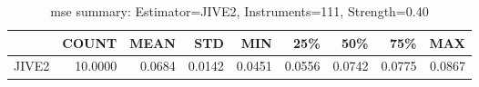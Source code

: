 \begin{table}[ht]
\centering
\caption{mse summary: Estimator=JIVE2, Instruments=111, Strength=0.40}
\begin{tabular}{lrrrrrrrr}
\toprule
 & COUNT & MEAN & STD & MIN & 25\% & 50\% & 75\% & MAX \\
\midrule
JIVE2 & 10.0000 & 0.0684 & 0.0142 & 0.0451 & 0.0556 & 0.0742 & 0.0775 & 0.0867 \\
\bottomrule
\end{tabular}
\end{table}
